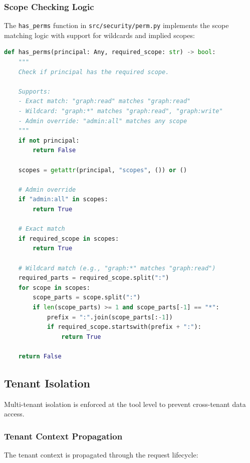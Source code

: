 \subsubsection{Scope Checking Logic}

The \texttt{has\_perms} function in \texttt{src/security/perm.py} implements the scope matching logic with support for wildcards and implied scopes:

\begin{lstlisting}[language=Python, caption={Scope checking with wildcard support}, label={lst:has-perms}]
def has_perms(principal: Any, required_scope: str) -> bool:
    """
    Check if principal has the required scope.
    
    Supports:
    - Exact match: "graph:read" matches "graph:read"
    - Wildcard: "graph:*" matches "graph:read", "graph:write"
    - Admin override: "admin:all" matches any scope
    """
    if not principal:
        return False
    
    scopes = getattr(principal, "scopes", ()) or ()
    
    # Admin override
    if "admin:all" in scopes:
        return True
    
    # Exact match
    if required_scope in scopes:
        return True
    
    # Wildcard match (e.g., "graph:*" matches "graph:read")
    required_parts = required_scope.split(":")
    for scope in scopes:
        scope_parts = scope.split(":")
        if len(scope_parts) >= 1 and scope_parts[-1] == "*":
            prefix = ":".join(scope_parts[:-1])
            if required_scope.startswith(prefix + ":"):
                return True
    
    return False
\end{lstlisting}

\subsection{Tenant Isolation}
\label{subsec:tenant-isolation}

Multi-tenant isolation is enforced at the tool level to prevent cross-tenant data access.

\subsubsection{Tenant Context Propagation}

The tenant context is propagated through the request lifecycle:

